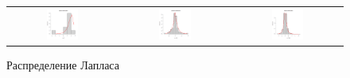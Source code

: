 \documentclass[a4paper,14pt]{article}
\begin{document}
	\begin{figure}[H]
		\centering
		\begin{tabular}{c c c}
			\includegraphics[height = 0.25\textheight, width = 0.31\textwidth]{./lab1_1/pictures/ n = 10 laplace distribution.png}
			& \includegraphics[height = 0.25\textheight, width = 0.31\textwidth]{./lab1_1/pictures/ n = 100 laplace distribution.png}
			& \includegraphics[height = 0.25\textheight, width = 0.31\textwidth]{./lab1_1/pictures/ n = 1000 laplace distribution.png}
		\end{tabular}
		\caption{Распределение Лапласа}
	\end{figure}
	
\end{document}
